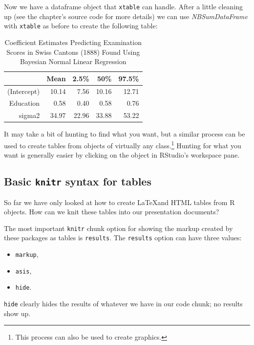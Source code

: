 \documentclass[ChapterTOCs,krantz1]{krantz}\usepackage{graphicx, color}
\begin{document}
\noindent Now we have a dataframe object that {\tt{xtable}} can handle. After a little cleaning up (see the chapter's source code for more details) we can use {\emph{NBSumDataFrame}} with {\tt{xtable}} as before to create the following table:
\vspace{0.5cm}


\begin{table}[ht]
\begin{center}
\begin{tabular}{rrrrr}
  \hline
 & Mean & 2.5\% & 50\% & 97.5\% \\ 
  \hline
(Intercept) & 10.14 & 7.56 & 10.16 & 12.71 \\ 
  Education & 0.58 & 0.40 & 0.58 & 0.76 \\ 
  sigma2 & 34.97 & 22.96 & 33.88 & 53.22 \\ 
   \hline
\end{tabular}
\caption{Coefficient Estimates Predicting Examination Scores in Swiss Cantons (1888) Found Using Bayesian Normal Linear Regression}
\end{center}
\end{table}




It may take a bit of hunting to find what you want, but a similar process can be used to create tables from objects of virtually any class.\footnote{This process can also be used to create graphics.} Hunting for what you want is generally easier by clicking on the object in RStudio's workspace pane.

\subsection{Basic \texttt{knitr} syntax for tables}

So far we have only looked at how to create \LaTeX and HTML tables from R objects. How can we knit these tables into our presentation documents?

The most important \texttt{knitr} chunk option for showing the markup created by these packages as tables is \texttt{results}. The \texttt{results} option can have three values:

\begin{itemize}
\item
  \texttt{markup},
\item
  \texttt{asis},
\item
  \texttt{hide}.
\end{itemize}
\texttt{hide} clearly hides the results of whatever we have in our code chunk; no results show up.
\end{document}
